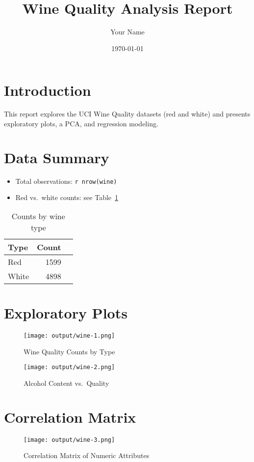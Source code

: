 \documentclass[11pt,a4paper]{article}
\title{Wine Quality Analysis Report}
\author{Your Name}
\date{\today}
\begin{document}
\maketitle

\section*{Introduction}
This report explores the UCI Wine Quality datasets (red and white)
and presents exploratory plots, a PCA, and regression modeling.

\section{Data Summary}
\begin{itemize}
  \item Total observations: \texttt{r nrow(wine)}
  \item Red vs.\ white counts: see Table~\ref{tab:type_counts}
\end{itemize}

\begin{table}[h]
\centering
\begin{tabular}{lrr}
\toprule
Type & Count \\
\midrule
Red   & 1599 \\
White & 4898 \\
\bottomrule
\end{tabular}
\caption{Counts by wine type}\label{tab:type_counts}
\end{table}

\section{Exploratory Plots}

\begin{figure}[h]
  \centering
  \texttt{[image: output/wine-1.png]}
  \caption{Wine Quality Counts by Type}
\end{figure}

\begin{figure}[h]
  \centering
  \texttt{[image: output/wine-2.png]}
  \caption{Alcohol Content vs.\ Quality}
\end{figure}

\section{Correlation Matrix}
\begin{figure}[h]
  \centering
  \texttt{[image: output/wine-3.png]}
  \caption{Correlation Matrix of Numeric Attributes}
\end{figure}
\end{document}

